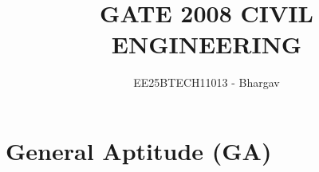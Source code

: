 \documentclass[journal]{IEEEtran}
\begin{document}




\title{GATE 2008 CIVIL ENGINEERING}
\author{EE25BTECH11013 - Bhargav}
\maketitle
{\let\newpage\relax\maketitle}

\renewcommand{\thefigure}{\theenumi}
\renewcommand{\thetable}{\theenumi}
\setlength{\intextsep}{10pt} %


\section*{General Aptitude (GA)}
\end{document}
